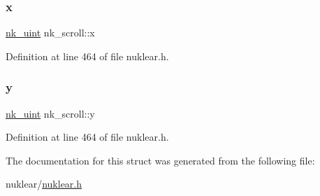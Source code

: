\subsubsection{\texorpdfstring{x}{x}}
{\footnotesize\ttfamily \mbox{\hyperlink{nuklear_8h_a951b598a3101b6d2a55d22ac39f57919}{nk\+\_\+uint}} nk\+\_\+scroll\+::x}



Definition at line 464 of file nuklear.\+h.

\mbox{\label{structnk__scroll_a44fba8e9fb1e206f240e20257aad50b7}} 
\subsubsection{\texorpdfstring{y}{y}}
{\footnotesize\ttfamily \mbox{\hyperlink{nuklear_8h_a951b598a3101b6d2a55d22ac39f57919}{nk\+\_\+uint}} nk\+\_\+scroll\+::y}



Definition at line 464 of file nuklear.\+h.



The documentation for this struct was generated from the following file\+:\begin{DoxyCompactItemize}
\item 
nuklear/\mbox{\hyperlink{nuklear_8h}{nuklear.\+h}}\end{DoxyCompactItemize}
